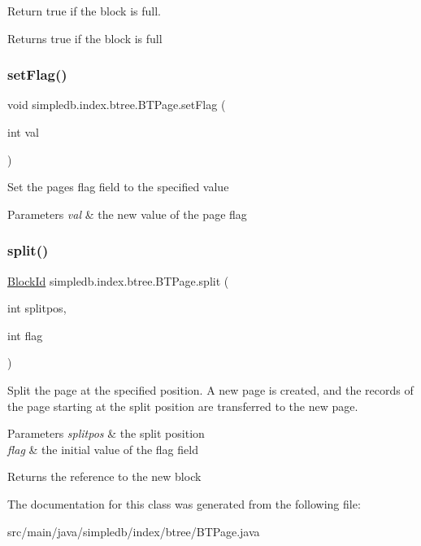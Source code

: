 Return true if the block is full. \begin{DoxyReturn}{Returns}
true if the block is full 
\end{DoxyReturn}
\mbox{\label{classsimpledb_1_1index_1_1btree_1_1BTPage_a7ae809da6323d411d984e706523fff46}} 
\subsubsection{\texorpdfstring{set\+Flag()}{setFlag()}}
{\footnotesize\ttfamily void simpledb.\+index.\+btree.\+B\+T\+Page.\+set\+Flag (\begin{DoxyParamCaption}\item[{int}]{val }\end{DoxyParamCaption})\hspace{0.3cm}{\ttfamily [inline]}}

Set the page\textquotesingle{}s flag field to the specified value 
\begin{DoxyParams}{Parameters}
{\em val} & the new value of the page flag \\
\hline
\end{DoxyParams}
\mbox{\label{classsimpledb_1_1index_1_1btree_1_1BTPage_acea0d766bf9bae1d35bf734e280505db}} 
\subsubsection{\texorpdfstring{split()}{split()}}
{\footnotesize\ttfamily \hyperlink{classsimpledb_1_1file_1_1BlockId}{Block\+Id} simpledb.\+index.\+btree.\+B\+T\+Page.\+split (\begin{DoxyParamCaption}\item[{int}]{splitpos,  }\item[{int}]{flag }\end{DoxyParamCaption})\hspace{0.3cm}{\ttfamily [inline]}}

Split the page at the specified position. A new page is created, and the records of the page starting at the split position are transferred to the new page. 
\begin{DoxyParams}{Parameters}
{\em splitpos} & the split position \\
\hline
{\em flag} & the initial value of the flag field \\
\hline
\end{DoxyParams}
\begin{DoxyReturn}{Returns}
the reference to the new block 
\end{DoxyReturn}


The documentation for this class was generated from the following file\+:\begin{DoxyCompactItemize}
\item 
src/main/java/simpledb/index/btree/B\+T\+Page.\+java\end{DoxyCompactItemize}
